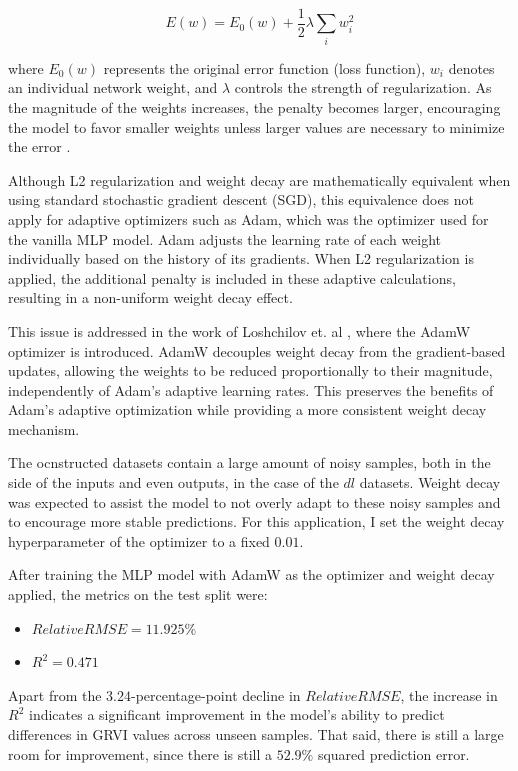 \begin{equation}
    E(w) = E_0(w) + \frac{1}{2}\lambda \sum_i w_i^2
    \label{eq:weight_decay}
\end{equation}

where $E_0(w)$ represents the original error function (loss function), $w_i$ denotes an individual network weight, and $\lambda$ controls the strength of regularization. As the magnitude of the weights increases, the penalty becomes larger, encouraging the model to favor smaller weights unless larger values are necessary to minimize the error \cite{wdecay}.

Although L2 regularization and weight decay are mathematically equivalent when using standard stochastic gradient descent (SGD), this equivalence does not apply for adaptive optimizers such as Adam, which was the optimizer used for the vanilla MLP model. Adam adjusts the learning rate of each weight individually based on the history of its gradients. When L2 regularization is applied, the additional penalty is included in these adaptive calculations, resulting in a non-uniform weight decay effect.

This issue is addressed in the work of Loshchilov et. al \cite{adamw}, where the AdamW optimizer is introduced. AdamW decouples weight decay from the gradient-based updates, allowing the weights to be reduced proportionally to their magnitude, independently of Adam's adaptive learning rates. This preserves the benefits of Adam's adaptive optimization while providing a more consistent weight decay mechanism.

The ocnstructed datasets contain a large amount of noisy samples, both in the side of the inputs and even outputs, in the case of the $dl$ datasets. Weight decay was expected to assist the model to not overly adapt to these noisy samples and to encourage more stable predictions. For this application, I set the weight decay hyperparameter of the optimizer to a fixed $0.01$.

After training the MLP model with AdamW as the optimizer and weight decay applied, the metrics on the test split were:

\begin{itemize}
    \item $RelativeRMSE = 11.925\%$
    \item $R^2 = 0.471$ 
\end{itemize}

Apart from the $3.24$-percentage-point decline in $RelativeRMSE$, the increase in $R^2$ indicates a significant improvement in the model's ability to predict differences in GRVI values across unseen samples. That said, there is still a large room for improvement, since there is still a $52.9\%$ squared prediction error.

